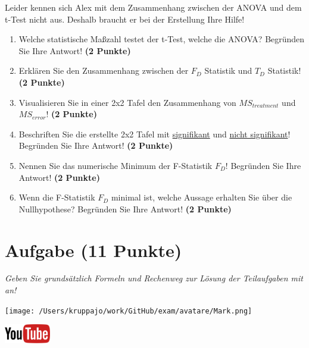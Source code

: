 \documentclass[a4paper, 9pt]{scrartcl}\usepackage[]{graphicx}\usepackage[]{xcolor}
\begin{document}
Leider kennen sich Alex mit dem Zusammenhang zwischen der ANOVA und dem t-Test nicht aus. Deshalb braucht er bei der Erstellung Ihre Hilfe! 

\begin{enumerate}
\item Welche statistische Maßzahl testet der t-Test, welche die ANOVA? Begründen Sie Ihre Antwort! \textbf{(2 Punkte)}
\item Erklären Sie den Zusammenhang zwischen der $F_{D}$ Statistik und $T_{D}$ Statistik! \textbf{(2 Punkte)}
\item Visualisieren Sie in einer 2x2 Tafel den Zusammenhang von $MS_{treatment}$ und $MS_{error}$! \textbf{(2 Punkte)}
\item Beschriften Sie die erstellte 2x2 Tafel mit \underline{signifikant} und \underline{nicht signifikant}! Begründen Sie Ihre Antwort! \textbf{(2 Punkte)}
\item Nennen Sie das numerische Minimum der F-Statistik $F_D$! Begründen Sie Ihre Antwort! \textbf{(2 Punkte)}
\item Wenn die F-Statistik $F_D$ minimal ist, welche Aussage erhalten Sie über die Nullhypothese? Begründen Sie Ihre Antwort! \textbf{(2 Punkte)}
\end{enumerate}

 
\clearpage

\section{Aufgabe \hfill (11 Punkte)}

\textit{Geben Sie grundsätzlich Formeln und Rechenweg zur Lösung der Teilaufgaben mit an!} \\[1Ex]
 

 
\begin{minipage}[t]{0.5\textwidth}
\texttt{[image: /Users/kruppajo/work/GitHub/exam/avatare/Mark.png]}
\end{minipage}
\begin{minipage}[t]{0.5\textwidth}
\hfill
\href{https://youtu.be/2qG1Dws0MJo}{\includegraphics[width = 2cm]{img/youtube}}\\[1Ex]
\end{minipage}
\vspace{1ex}
\end{document}
